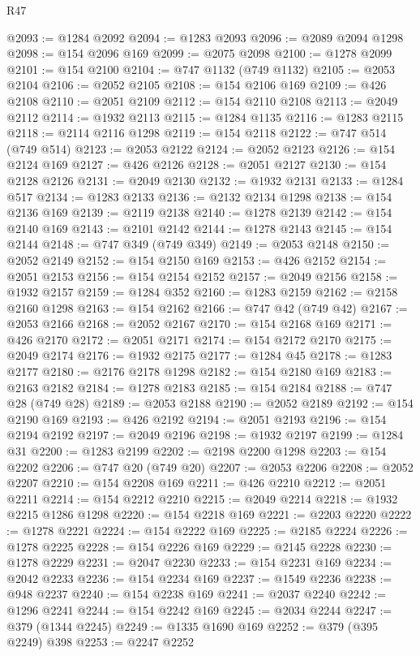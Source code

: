 \begin{lexlean}{R47}
\begin{coremodule}
@2093 := @1284 @2092
@2094 := @1283 @2093
@2096 := @2089 @2094 @1298
@2098 := @154 @2096 @169
@2099 := @2075 @2098
@2100 := @1278 @2099
@2101 := @154 @2100
@2104 := @747 @1132 (@749 @1132)
@2105 := @2053 @2104
@2106 := @2052 @2105
@2108 := @154 @2106 @169
@2109 := @426 @2108
@2110 := @2051 @2109
@2112 := @154 @2110 @2108
@2113 := @2049 @2112
@2114 := @1932 @2113
@2115 := @1284 @1135
@2116 := @1283 @2115
@2118 := @2114 @2116 @1298
@2119 := @154 @2118
@2122 := @747 @514 (@749 @514)
@2123 := @2053 @2122
@2124 := @2052 @2123
@2126 := @154 @2124 @169
@2127 := @426 @2126
@2128 := @2051 @2127
@2130 := @154 @2128 @2126
@2131 := @2049 @2130
@2132 := @1932 @2131
@2133 := @1284 @517
@2134 := @1283 @2133
@2136 := @2132 @2134 @1298
@2138 := @154 @2136 @169
@2139 := @2119 @2138
@2140 := @1278 @2139
@2142 := @154 @2140 @169
@2143 := @2101 @2142
@2144 := @1278 @2143
@2145 := @154 @2144
@2148 := @747 @349 (@749 @349)
@2149 := @2053 @2148
@2150 := @2052 @2149
@2152 := @154 @2150 @169
@2153 := @426 @2152
@2154 := @2051 @2153
@2156 := @154 @2154 @2152
@2157 := @2049 @2156
@2158 := @1932 @2157
@2159 := @1284 @352
@2160 := @1283 @2159
@2162 := @2158 @2160 @1298
@2163 := @154 @2162
@2166 := @747 @42 (@749 @42)
@2167 := @2053 @2166
@2168 := @2052 @2167
@2170 := @154 @2168 @169
@2171 := @426 @2170
@2172 := @2051 @2171
@2174 := @154 @2172 @2170
@2175 := @2049 @2174
@2176 := @1932 @2175
@2177 := @1284 @45
@2178 := @1283 @2177
@2180 := @2176 @2178 @1298
@2182 := @154 @2180 @169
@2183 := @2163 @2182
@2184 := @1278 @2183
@2185 := @154 @2184
@2188 := @747 @28 (@749 @28)
@2189 := @2053 @2188
@2190 := @2052 @2189
@2192 := @154 @2190 @169
@2193 := @426 @2192
@2194 := @2051 @2193
@2196 := @154 @2194 @2192
@2197 := @2049 @2196
@2198 := @1932 @2197
@2199 := @1284 @31
@2200 := @1283 @2199
@2202 := @2198 @2200 @1298
@2203 := @154 @2202
@2206 := @747 @20 (@749 @20)
@2207 := @2053 @2206
@2208 := @2052 @2207
@2210 := @154 @2208 @169
@2211 := @426 @2210
@2212 := @2051 @2211
@2214 := @154 @2212 @2210
@2215 := @2049 @2214
@2218 := @1932 @2215 @1286 @1298
@2220 := @154 @2218 @169
@2221 := @2203 @2220
@2222 := @1278 @2221
@2224 := @154 @2222 @169
@2225 := @2185 @2224
@2226 := @1278 @2225
@2228 := @154 @2226 @169
@2229 := @2145 @2228
@2230 := @1278 @2229
@2231 := @2047 @2230
@2233 := @154 @2231 @169
@2234 := @2042 @2233
@2236 := @154 @2234 @169
@2237 := @1549 @2236
@2238 := @948 @2237
@2240 := @154 @2238 @169
@2241 := @2037 @2240
@2242 := @1296 @2241
@2244 := @154 @2242 @169
@2245 := @2034 @2244
@2247 := @379 (@1344 @2245)
@2249 := @1335 @1690 @169
@2252 := @379 (@395 @2249) @398
@2253 := @2247 @2252

\end{coremodule}
\end{lexlean}
